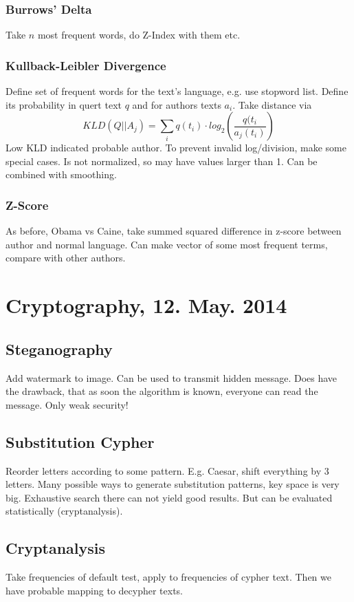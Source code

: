 \documentclass[11pt]{article}
\begin{document}
\subsubsection{Burrows' Delta}
Take $n$ most frequent words, do Z-Index with them etc.
\subsubsection{Kullback-Leibler Divergence}
Define set of frequent words for the text's language, e.g. use stopword list. 
Define its probability in quert text
 $q$ and for authors texts $a_i$. Take distance via
\begin{equation}
	KLD(Q|| A_j) = \sum_i q(t_i) \cdot log_2 \left( \frac{q(t_i}{a_j(t_i)} \right)
\end{equation}
Low KLD indicated probable author. To prevent invalid log/division, make some special cases.
Is not normalized, so may have values larger than 1. Can be combined with smoothing.
\subsubsection{Z-Score}
As before, Obama vs Caine, take summed squared difference in z-score between author and 
normal language. Can make vector of some most frequent terms, compare with other authors.

\section{Cryptography, 12. May. 2014}
\subsection{Steganography}
Add watermark to image. Can be used to transmit hidden message. Does have the drawback, that
as soon the algorithm is known, everyone can read the message. Only weak security!
\subsection{Substitution Cypher}
Reorder letters according to some pattern. E.g. Caesar, shift everything by 3 letters. 
Many possible ways to generate substitution patterns, key space is very big. Exhaustive 
search there can not yield good results. But can be evaluated statistically (cryptanalysis).

\subsection{Cryptanalysis}
Take frequencies of default test, apply to frequencies of cypher text. Then we have probable
mapping to decypher texts.
\end{document}
